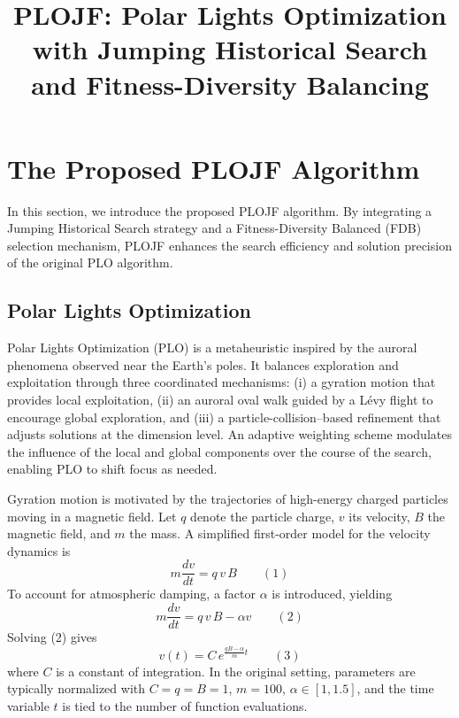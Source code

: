 \documentclass[3p]{elsarticle}
\begin{document}
\begin{frontmatter}

\title{\textbf{PLOJF: Polar Lights Optimization with Jumping Historical Search and Fitness-Diversity Balancing}}

\begin{abstract}

\end{abstract}

\begin{keyword}

\end{keyword}

\end{frontmatter}

\section{The Proposed PLOJF Algorithm}
In this section, we introduce the proposed PLOJF algorithm. By integrating a Jumping Historical Search strategy and a Fitness-Diversity Balanced (FDB) selection mechanism, PLOJF enhances the search efficiency and solution precision of the original PLO algorithm.

\subsection{Polar Lights Optimization}
Polar Lights Optimization (PLO) is a metaheuristic inspired by the auroral phenomena observed near the Earth's poles. It balances exploration and exploitation through three coordinated mechanisms: (i) a gyration motion that provides local exploitation, (ii) an auroral oval walk guided by a Lévy flight to encourage global exploration, and (iii) a particle-collision–based refinement that adjusts solutions at the dimension level. An adaptive weighting scheme modulates the influence of the local and global components over the course of the search, enabling PLO to shift focus as needed.

Gyration motion is motivated by the trajectories of high-energy charged particles moving in a magnetic field. Let \(q\) denote the particle charge, \(v\) its velocity, \(B\) the magnetic field, and \(m\) the mass. A simplified first-order model for the velocity dynamics is
\[ m\frac{dv}{dt} = q\,v\,B \qquad(1) \]
To account for atmospheric damping, a factor \(\alpha\) is introduced, yielding
\[ m\frac{dv}{dt} = q\,v\,B - \alpha v \qquad(2) \]
Solving (2) gives
\[ v(t) = C\,e^{\frac{qB-\alpha}{m}t} \qquad(3) \]
where \(C\) is a constant of integration. In the original setting, parameters are typically normalized with \(C=q=B=1\), \(m=100\), \(\alpha\in[1,1.5]\), and the time variable \(t\) is tied to the number of function evaluations.
\end{document}
